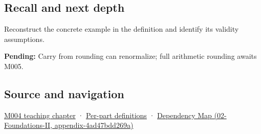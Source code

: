 \subsection{Recall and next depth}\label{recall-and-next-depth}

Reconstruct the concrete example in the definition and identify its validity assumptions.

\textbf{Pending:} Carry from rounding can renormalize; full arithmetic rounding awaits M005.

\subsection{Source and navigation}\label{source-and-navigation}

\href{Continuous\%20Notes/Computing\%20Foundations\%20-\%20From\%20Bits\%20to\%20C++\%20and\%20Systems\%20APIs\#A\%20stretching\%20ruler\%20for\%20real-valued\%20quantities}{M004 teaching chapter} · \hyperref[appendix-fd090d982a15]{Per-part definitions} · \href{}{Dependency Map (02-Foundations-II, appendix-4ad47bdd269a)}
